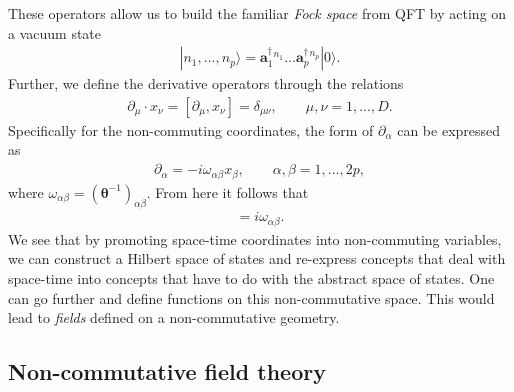     These operators allow us to build the familiar \textit{Fock space} from QFT by acting on a vacuum state
    \begin{align}
        |n_1,...,n_p\rangle=  \bm{a}^{\dag}_1^{n_1}... \bm{a}^{\dag}_p^{n_p}|0\rangle.
    \end{align}
Further, we define the derivative operators through the relations
    \begin{align}
        \partial_{\mu} \cdot x_{\nu} = [\partial_{\mu}, x_{\nu}] = \delta_{\mu \nu}, \qquad \mu,\nu = 1,...,D.
    \end{align}
    Specifically for the non-commuting coordinates, the form of $\partial_{\alpha}$ can be expressed as 
    \begin{align}
        \partial_{\alpha}= -i \omega_{\alpha \beta} x_{\beta}, \qquad \alpha, \beta = 1,...,2p,
    \end{align}
    where $\omega_{\alpha \beta} = \left({ \bm \theta}^{-1} \right)_{\alpha \beta}$. From here it follows that
    \begin{align}
        [\partial_{\alpha}, \partial_{\beta}] = i \omega_{\alpha \beta}.
    \end{align}
We see that by promoting space-time coordinates into non-commuting variables, we can construct a Hilbert space of states and re-express concepts that deal with space-time into concepts that have to do with the abstract space of states. One can go further and define functions on this non-commutative space. This would lead to \textit{fields} defined on a non-commutative geometry. 


    \subsection{Non-commutative field theory}

